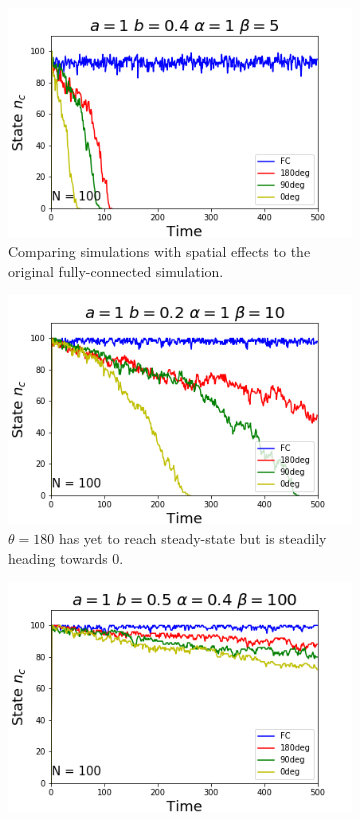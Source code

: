 \begin{figure}[h]
  \centering
  \begin{subfigure}[b]{0.4\linewidth}
    \includegraphics[width=\linewidth]{images/chapter4/feedback_sim4.png}
    \caption{Comparing simulations with spatial effects to the original fully-connected simulation.}
  \end{subfigure}
  \begin{subfigure}[b]{0.4\linewidth}
    \includegraphics[width=\linewidth]{images/chapter4/feedback_sim5.png}
    \caption{$\theta = 180$ has yet to reach steady-state but is steadily heading towards $0$.}
  \end{subfigure}
    \begin{subfigure}[b]{0.4\linewidth}
    \includegraphics[width=\linewidth]{images/chapter4/feedback_sim6.png}

\end{subfigure}
\end{figure}
